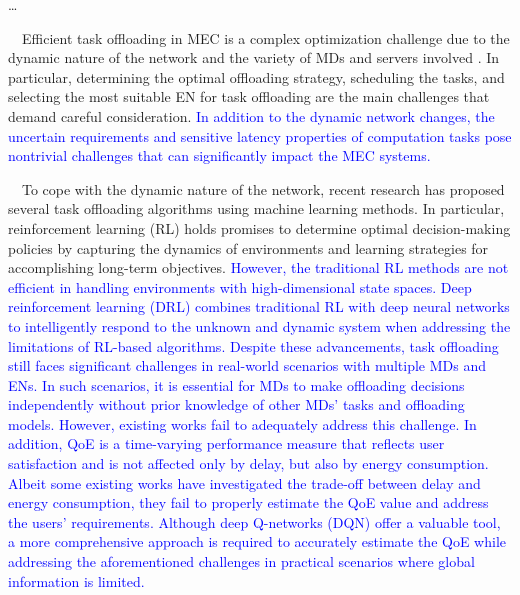 \documentclass[12pt,draftclsnofoot,onecolumn]{IEEEtran}
\newcommand{\rev}[1]{{\color{blue}#1}} %
\newcommand{\rev}[1]{#1}
\newenvironment{my}[2]%
{\begin{list}{}%
{\setlength{\rightmargin}{#1}\setlength{\leftmargin}{#2}}%


 \item[]{}

} {\end{list}}
\begin{document}
\begin{enumerate}
\begin{my}{1cm}{1cm}
	\rev{
		
		
		\color{black}
		

		\dots 
		
		
		\,\,\,\,
		Efficient task offloading in MEC is a complex optimization challenge due to the dynamic nature of the network and the variety of MDs and servers involved \cite{jiang2019toward} \cite{TNSE-WU-24}. In particular, determining the optimal offloading strategy, scheduling the tasks, and selecting the most suitable EN for task offloading are the main challenges that demand careful consideration. \textcolor{blue}{In addition to the dynamic network changes, the uncertain requirements and sensitive latency properties of computation tasks pose nontrivial challenges that can significantly impact the MEC systems.}\vspace{3mm}
		
		
		\,\,\,\,
To cope with the dynamic nature of the network, recent research has proposed several task offloading algorithms using machine learning methods. In particular, reinforcement learning (RL) \cite{mnih2015human} holds promises to determine optimal decision-making policies by capturing the dynamics of environments and learning strategies for accomplishing long-term objectives. \textcolor{blue}{However, the traditional RL methods are not efficient in handling environments with high-dimensional state  spaces. Deep reinforcement learning (DRL) combines  traditional RL  with  deep  neural  networks  to  intelligently respond to the unknown and dynamic system when addressing the limitations of RL-based algorithms. Despite these advancements, task offloading still faces significant challenges in real-world scenarios with multiple MDs and ENs. In such scenarios, it is essential for MDs to make offloading decisions independently  without prior knowledge of other MDs’ tasks and offloading models. However, existing works fail to adequately address this challenge. In addition, QoE is a time-varying performance measure that reflects user satisfaction and is not affected only by delay, but also by energy consumption. Albeit some existing works have investigated the trade-off between delay and energy consumption, they fail to properly estimate the QoE value and address the users' requirements. Although deep Q-networks (DQN) offer a valuable tool, a more comprehensive approach is required to accurately estimate the QoE while addressing the aforementioned challenges in practical scenarios where global information is limited.}\vspace{3mm}
		

}
\end{my}
\end{enumerate}
\end{document}
